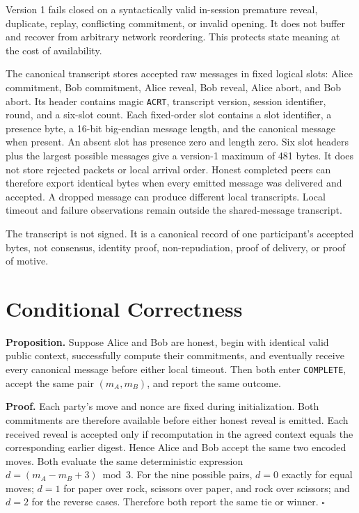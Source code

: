 Version 1 fails closed on a syntactically valid in-session premature reveal,
duplicate, replay, conflicting commitment, or invalid opening. It does not
buffer and recover from arbitrary network reordering. This protects state
meaning at the cost of availability.

The canonical transcript stores accepted raw messages in fixed logical slots:
Alice commitment, Bob commitment, Alice reveal, Bob reveal, Alice abort, and
Bob abort. Its header contains magic \texttt{ACRT}, transcript version,
session identifier, round, and a six-slot count. Each fixed-order slot contains
a slot identifier, a presence byte, a 16-bit big-endian message length, and the
canonical message when present. An absent slot has presence zero and length
zero. Six slot headers plus the largest possible messages give a version-1
maximum of 481 bytes. It does not store rejected packets or local arrival
order. Honest completed peers can therefore export identical bytes when every emitted
message was delivered and accepted. A dropped message can produce different
local transcripts. Local timeout and failure observations remain outside the
shared-message transcript.

The transcript is not signed. It is a canonical record of one participant's
accepted bytes, not consensus, identity proof, non-repudiation, proof of
delivery, or proof of motive.

\section{Conditional Correctness}

\textbf{Proposition.} Suppose Alice and Bob are honest, begin with identical
valid public context, successfully compute their commitments, and eventually
receive every canonical message before either local timeout. Then both enter
\texttt{COMPLETE}, accept the same pair \((m_A,m_B)\), and report the same
outcome.

\textbf{Proof.} Each party's move and nonce are fixed during initialization.
Both commitments are therefore available before either honest reveal is
emitted. Each received reveal is accepted only if recomputation in the agreed
context equals the corresponding earlier digest. Hence Alice and Bob accept
the same two encoded moves. Both evaluate the same deterministic expression
\(d=(m_A-m_B+3)\bmod 3\). For the nine possible pairs, \(d=0\) exactly for
equal moves; \(d=1\) for paper over rock, scissors over paper, and rock over
scissors; and \(d=2\) for the reverse cases. Therefore both report the same
tie or winner. \(\square\)

